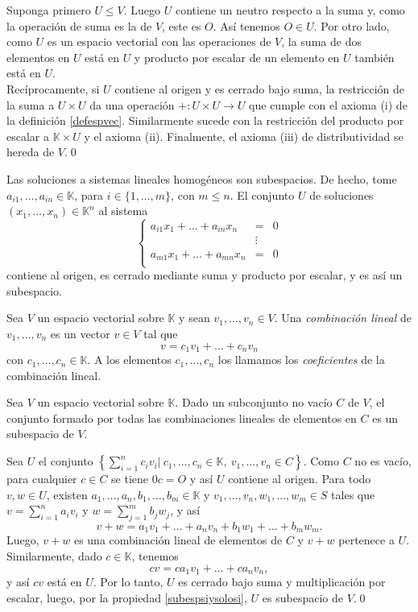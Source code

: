 \dem Suponga primero $U\le V$. Luego $U$ contiene un neutro respecto a la suma y, como la operaci\'on de suma es la de $V$, este es $O$. As\'i tenemos $O\in U$. Por otro lado, como $U$ es un espacio vectorial con las operaciones de $V$, la suma de dos elementos en $U$ est\'a en $U$ y producto por escalar de un elemento en $U$ tambi\'en est\'a en $U$.\\
Rec\'iprocamente, si $U$ contiene al origen y es cerrado bajo suma, la restricci\'on de la suma a $U\times U$ da una operaci\'on $+:U\times U\rightarrow U$ que cumple con el axioma (i) de la definici\'on \ref{defespvec}. Similarmente sucede con la restricci\'on del producto por escalar a $\mathbb{K}\times U$ y el axioma (ii). Finalmente, el axioma (iii) de distributividad se hereda de $V$.\qed

\begin{ejem}
Las soluciones a sistemas lineales homogéneos son subespacios. De hecho, tome $a_{i1},\ldots,a_{in}\in \mathbb{K}$, para $i\in\{1,\ldots,m\}$, con $m\le n$. El conjunto $U$ de soluciones $(x_1,\ldots,x_n)\in\mathbb{K}^n$ al sistema
$$\left\{
\begin{array}{lcr}
  a_{i1}x_1+\ldots+a_{in}x_n & = & 0\\
   & \vdots & \\
  a_{m1}x_1+\ldots+a_{mn}x_n & = & 0\\
\end{array}
\right.$$
contiene al origen, es cerrado mediante suma y producto por escalar, y es así un subespacio.
\end{ejem}

\begin{defn}
Sea $V$ un espacio vectorial sobre $\mathbb{K}$ y sean $v_1,\ldots,v_n\in V$. Una \emph{combinaci\'on lineal} de  $v_1,\ldots,v_n$ es un vector $v\in V$ tal que
\[
v=c_1v_1+\ldots+c_nv_n
\]
con $c_1,\ldots,c_n\in\mathbb{K}$. A los elementos $c_1,\ldots,c_n$ los llamamos los \emph{coeficientes} de la combinaci\'on lineal.
\end{defn}

\begin{prop}
Sea $V$ un espacio vectorial sobre $\mathbb{K}$. Dado un subconjunto no vac\'io $C$ de $V$, el conjunto formado por todas las combinaciones lineales de elementos en $C$ es un subespacio de $V$.
\end{prop}

\dem Sea $U$ el conjunto $\left\{\sum_{i=1}^nc_iv_i\Big|\ c_1,\ldots,c_n\in \mathbb{K},\ v_1,\ldots,v_n\in C \right\}$. Como $C$ no es vacío, para cualquier $c\in C$ se tiene $0c=O$ y así $U$ contiene al origen.
Para todo $v,w\in U$, existen $a_1,\ldots,a_n,b_1,\ldots,b_m\in \mathbb{K}$ y $v_1,\ldots,v_n,w_1,\ldots,w_m\in S$ tales que $v=\sum_{i=1}^n a_iv_i$ y $w=\sum_{j=1}^m b_jw_j$, y así
\[
v+w=a_1v_1+\ldots+a_nv_n+b_1w_1+\ldots+b_mw_m.
\]
Luego, $v+w$ es una combinaci\'on lineal de elementos de $C$ y $v+w$ pertenece a $U$. Similarmente, dado $c\in \mathbb{K}$, tenemos
\[
cv=ca_1v_1+\ldots+ca_nv_n,
\]
y as\'i $cv$ est\'a en $U$. Por lo tanto, $U$ es cerrado bajo suma y multiplicaci\'on por escalar, luego, por la propiedad \ref{subespsiysolosi}, $U$ es subespacio de $V$.\qed


